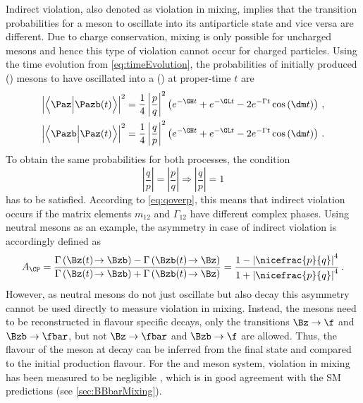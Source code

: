 Indirect \CP violation, also denoted as \CP violation in mixing, implies that the transition probabilities for a meson \Paz to oscillate into its antiparticle state \Pazb and vice versa are different.
Due to charge conservation, mixing is only possible for uncharged mesons and hence this type of \CP violation cannot occur for charged particles.
Using the time evolution from \cref{eq:timeEvolution}, the probabilities of \eg initially produced \Paz (\Pazb) mesons to have oscillated into a \Pazb (\Paz) at proper-time $t$ are
\begin{align}
\left|\left<\Paz\Big|\Pazb\!\left(t\right)\right>\right|^2=\frac{1}{4}\left|\frac{p}{q}\right|^2
\left(e^{-\GH t}+e^{-\GL t}-2e^{-\Gamma t}\cos\left(\dm t\right)\right)\,,\\
\left|\left<\Pazb\Big|\Paz\!\left(t\right)\right>\right|^2=\frac{1}{4}\left|\frac{q}{p}\right|^2
\left(e^{-\GH t}+e^{-\GL t}-2e^{-\Gamma t}\cos\left(\dm t\right)\right)\,.
\end{align}
To obtain the same probabilities for both processes, the condition
\begin{equation}
\left|\frac{q}{p}\right|=\left|\frac{p}{q}\right| \Rightarrow \left|\frac{q}{p}\right|=1
\end{equation}
has to be satisfied.
According to \cref{eq:qoverp}, this means that indirect \CP violation occurs if the matrix elements $m_{12}$ and $\Gamma_{12}$ have different complex phases.
Using neutral \B mesons as an example, the \CP asymmetry in case of indirect \CP violation is accordingly defined as
\begin{equation}
A_{\CP}=\frac{\Gamma\left(\Bz(t)\!\to\Bzb\right) - \Gamma\left(\Bzb(t)\!\to\Bz\right)}{\Gamma\left(\Bz(t)\!\to\Bzb\right) + \Gamma\left(\Bzb(t)\!\to\Bz\right)}
= \frac{1-\left|\nicefrac{p}{q}\right|^4}{1+\left|\nicefrac{p}{q}\right|^4}\,.
\end{equation}
However, as neutral \B mesons do not just oscillate but also decay this asymmetry cannot be used directly to measure \CP violation in mixing.
Instead, the \B mesons need to be reconstructed in flavour specific decays, \ie only the transitions $\Bz\to\f$ and $\Bzb\to\fbar$, but not $\Bz\to\fbar$ and $\Bzb\to\f$ are allowed.
Thus, the flavour of the meson at decay can be inferred from the final state and compared to the initial production flavour.
For the \Bz and \Bs meson system, \CP violation in mixing has been measured to be negligible \cite{HFLAV2016}, which is in good agreement with the \ac{SM} predictions (see \cref{sec:BBbarMixing}).

